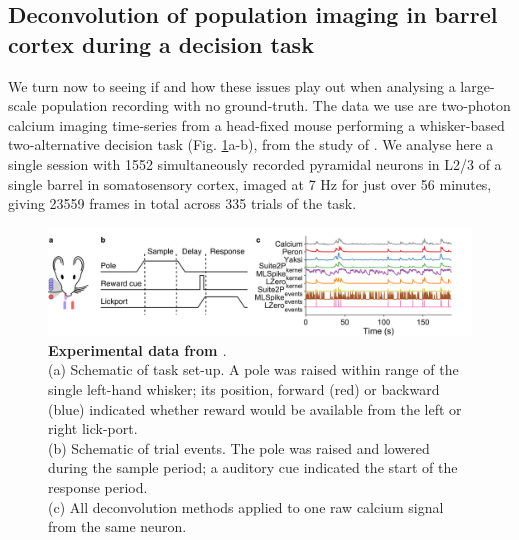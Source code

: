 \documentclass[a4paper,11pt]{article}
\begin{document}
\subsection{Deconvolution of population imaging in barrel cortex during a decision task}
We turn now to seeing if and how these issues play out when analysing a large-scale population recording with no ground-truth. The data we use are two-photon calcium imaging time-series from a head-fixed mouse performing a whisker-based two-alternative decision task (Fig. \ref{fig:peron_setup}a-b), from the study of \citet{Peron2015-kd}. We analyse here a single session with 1552 simultaneously recorded pyramidal neurons in L2/3 of a single barrel in somatosensory cortex, imaged at 7 Hz for just over 56 minutes, giving 23559 frames in total across 335 trials of the task. 

\begin{figure}[h!]
\includegraphics[width=\textwidth]{composite_figs/fig3_schematic.png}
    \caption{\label{fig:peron_setup} \textbf{Experimental data from \citet{Peron2015-kd}}. \\
		(a) Schematic of task set-up. A pole was raised within range of the single left-hand whisker; its position, forward (red) or backward (blue) indicated whether reward would be available from the left or right lick-port. \\
		(b) Schematic of trial events. The pole was raised and lowered during the sample period; a auditory cue indicated the start of the response period. \\
		(c) All deconvolution methods applied to one raw calcium signal from the same neuron.}
\end{figure}
\end{document}
